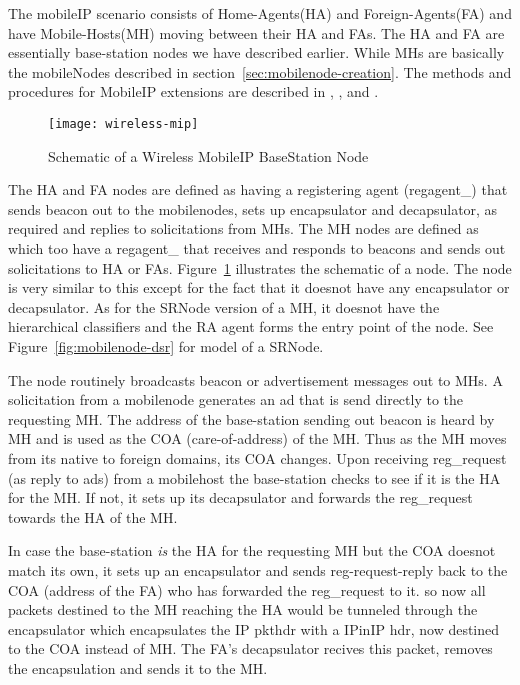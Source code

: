 {The mobileIP scenario consists of Home-Agents(HA) and
Foreign-Agents(FA) and have Mobile-Hosts(MH) moving between their HA
and FAs.
The HA and FA are essentially base-station nodes we have described
earlier. While MHs are basically the mobileNodes described in
section~\ref{sec:mobilenode-creation}.
The methods and procedures for MobileIP extensions are described in
, ,  and
.

\begin{figure}
    \centerline{\texttt{[image: wireless-mip]}}
    \caption{Schematic of a Wireless MobileIP BaseStation Node}
    \label{fig:mobilenode-wireless-mip}
\end{figure}
The HA and FA nodes are defined as  having a
registering agent (regagent\_) that sends beacon out to the
mobilenodes, sets up encapsulator and decapsulator, as required and
replies to solicitations from MHs. 
The MH nodes are defined as  which too have a
regagent\_ that receives and responds to beacons and sends out
solicitations to HA or FAs. Figure~\ref{fig:mobilenode-wireless-mip}
illustrates the schematic of a  
node. The  node is very similar to this except
for the fact that it doesnot have any encapsulator or decapsulator. As
for the SRNode version of a MH, it doesnot have the hierarchical
classifiers and the RA agent forms the entry point of the node. See
Figure~\ref{fig:mobilenode-dsr} for model of a SRNode. 

The  node routinely broadcasts beacon or
advertisement messages out to MHs. A solicitation from a mobilenode
generates an ad that is send directly to the requesting MH. The
address of the base-station sending out beacon is heard by 
MH and is used as the COA (care-of-address) of the MH. Thus as the MH
moves from its native to foreign domains, its COA changes. 
Upon receiving  reg\_request (as reply to ads) from a mobilehost the
base-station checks to see if it is the HA for the MH. If not, it sets
up its decapsulator and forwards the reg\_request towards the HA of
the MH. 

In case the base-station {\em is} the HA for the requesting MH but the
COA doesnot match its own, it sets up an encapsulator and sends
reg-request-reply back to the COA (address of the FA) who has
forwarded the reg\_request to it. so now all packets destined to the
MH reaching the HA would be tunneled through the encapsulator which
encapsulates the IP pkthdr with a IPinIP hdr, now destined to the COA
instead of MH. The FA's decapsulator recives this packet, removes the
encapsulation and sends it to the MH.

}
